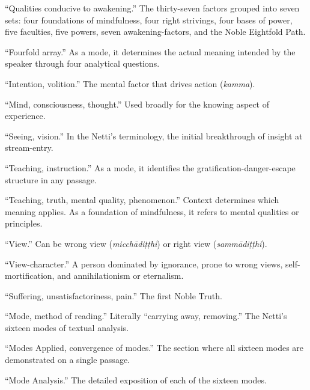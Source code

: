 \begin{description}[style=nextline, labelwidth=3.5cm, leftmargin=3.8cm, font=\itshape]
\item[bodhipakkhiyā dhammā] ``Qualities conducive to awakening.'' The thirty-seven factors grouped into seven sets: four foundations of mindfulness, four right strivings, four bases of power, five faculties, five powers, seven awakening-factors, and the Noble Eightfold Path.

\item[catubyūha] ``Fourfold array.'' As a mode, it determines the actual meaning intended by the speaker through four analytical questions.

\item[cetanā] ``Intention, volition.'' The mental factor that drives action (\textit{kamma}).

\item[citta] ``Mind, consciousness, thought.'' Used broadly for the knowing aspect of experience.

\item[dassana] ``Seeing, vision.'' In the Netti's terminology, the initial breakthrough of insight at stream-entry.

\item[desanā] ``Teaching, instruction.'' As a mode, it identifies the gratification-danger-escape structure in any passage.

\item[dhamma] ``Teaching, truth, mental quality, phenomenon.'' Context determines which meaning applies. As a foundation of mindfulness, it refers to mental qualities or principles.

\item[diṭṭhi] ``View.'' Can be wrong view (\textit{micchādiṭṭhi}) or right view (\textit{sammādiṭṭhi}).

\item[diṭṭhicarita] ``View-character.'' A person dominated by ignorance, prone to wrong views, self-mortification, and annihilationism or eternalism.

\item[dukkha] ``Suffering, unsatisfactoriness, pain.'' The first Noble Truth.

\item[hāra] ``Mode, method of reading.'' Literally ``carrying away, removing.'' The Netti's sixteen modes of textual analysis.

\item[hārasampāta] ``Modes Applied, convergence of modes.'' The section where all sixteen modes are demonstrated on a single passage.

\item[hāravibhaṅga] ``Mode Analysis.'' The detailed exposition of each of the sixteen modes.


\end{description}
